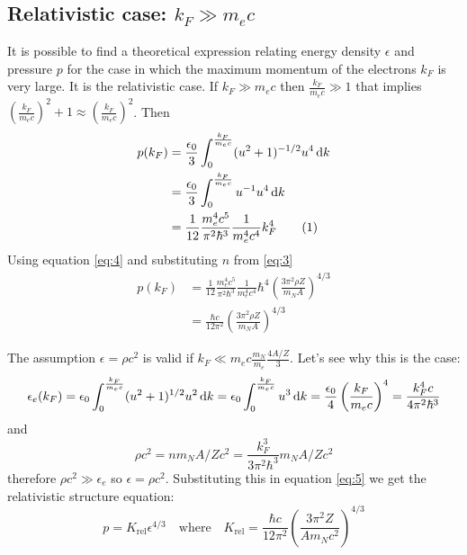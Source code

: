 \documentclass[a4paper]{article}
\newcommand\numberthis{\addtocounter{equation}{1}\tag{\theequation}}
\begin{document}
\subsection[Relativistic case]{Relativistic case: $k_F\gg m_ec$} \label{sec:relativistic_limit}
It is possible to find a theoretical expression relating energy density $\epsilon$ and pressure $p$ for the case in which the maximum momentum of the electrons $k_F$ is very large. It is the relativistic case. If $k_F\gg m_ec$ then $\frac{k_F}{m_ec}\gg 1$ that implies $\left(\frac{k_F}{m_ec}\right)^2 + 1 \approx \left(\frac{k_F}{m_ec}\right)^2$. Then
\begin{align*}
    p(k_F) &= \frac{\epsilon_0}{3}\int^{\frac{k_F}{m_ec}}_{0} (u^2+1)^{-1/2} u^4 \odif{k} \\
    & = \frac{\epsilon_0}{3}\int^{\frac{k_F}{m_ec}}_{0} u^{-1} u^4 \odif{k}\\
    & = \frac{1}{12} \frac{m_e^4c^5}{\pi^2\hbar^3} \frac{1}{m_e^4c^4}k_F^4 \numberthis
\end{align*}
Using equation \eqref{eq:4} and substituting $n$ from \eqref{eq:3}
\begin{equation} \label{eq:5}
\begin{split}
    p(k_F) &= \frac{1}{12} \frac{m_e^4c^5}{\pi^2\hbar^3} \frac{1}{m_e^4c^4}\hbar^4\left(\frac{3\pi^2\rho Z}{m_NA}\right)^{4/3} \\
    &= \frac{\hbar c}{12 \pi ^2}\left(\frac{3\pi^2\rho Z}{m_NA}\right)^{4/3}
\end{split}
\end{equation}

The assumption $\epsilon = \rho c^2$ is valid if $k_F \ll m_ec\frac{m_N}{m_e}\frac{4A/Z}{3}$. Let's see why this is the case:
\begin{equation}
    \epsilon_e(k_F) = \epsilon_0 \int^{\frac{k_F}{m_ec}}_{0} (u^2+1)^{1/2} u^2 \odif{k}
    = \epsilon_0 \int^{\frac{k_F}{m_ec}}_{0} u^3 \odif{k}
    = \frac{\epsilon_0}{4}\left(\frac{k_F}{m_ec}\right)^4= \frac{k_F^4c}{4\pi^2\hbar^3}
\end{equation}
and
\begin{equation}
    \rho c^2 = nm_NA/Zc^2 = \frac{k_F^3}{3\pi^2\hbar^3}m_NA/Zc^2
\end{equation}
therefore $\rho c^2 \gg  \epsilon_e$ so $\epsilon = \rho c^2$. Substituting this in equation \eqref{eq:5} we get the relativistic structure equation:
\begin{equation} \label{eq:24}
    p = K_{\mathrm{rel}} \epsilon^{4/3}
    \quad \mathrm{where} \quad
    K_{\mathrm{rel}}=
    \frac{\hbar c}{12 \pi ^2}\left(\frac{3\pi^2Z}{Am_Nc^2}\right)^{4/3}
\end{equation}
\end{document}
